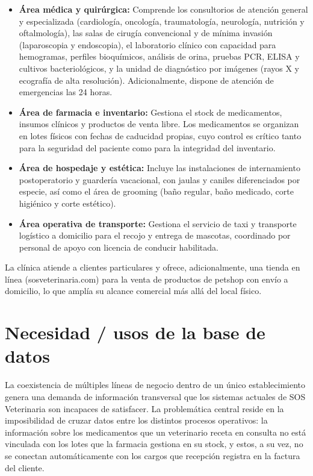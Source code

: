 \begin{itemize}
	\item \textbf{Área médica y quirúrgica:} Comprende los consultorios de atención general y especializada (cardiología, oncología, traumatología, neurología, nutrición y oftalmología), las salas de cirugía convencional y de mínima invasión (laparoscopia y endoscopia), el laboratorio clínico con capacidad para hemogramas, perfiles bioquímicos, análisis de orina, pruebas PCR, ELISA y cultivos bacteriológicos, y la unidad de diagnóstico por imágenes (rayos X y ecografía de alta resolución). Adicionalmente, dispone de atención de emergencias las 24 horas.
	\item \textbf{Área de farmacia e inventario:} Gestiona el stock de medicamentos, insumos clínicos y productos de venta libre. Los medicamentos se organizan en lotes físicos con fechas de caducidad propias, cuyo control es crítico tanto para la seguridad del paciente como para la integridad del inventario.
	\item \textbf{Área de hospedaje y estética:} Incluye las instalaciones de internamiento postoperatorio y guardería vacacional, con jaulas y caniles diferenciados por especie, así como el área de grooming (baño regular, baño medicado, corte higiénico y corte estético).
	\item \textbf{Área operativa de transporte:} Gestiona el servicio de taxi y transporte logístico a domicilio para el recojo y entrega de mascotas, coordinado por personal de apoyo con licencia de conducir habilitada.
\end{itemize}

La clínica atiende a clientes particulares y ofrece, adicionalmente, una tienda en línea (sosveterinaria.com) para la venta de productos de petshop con envío a domicilio, lo que amplía su alcance comercial más allá del local físico.

\section{Necesidad / usos de la base de datos}

La coexistencia de múltiples líneas de negocio dentro de un único establecimiento genera una demanda de información transversal que los sistemas actuales de SOS Veterinaria son incapaces de satisfacer. La problemática central reside en la imposibilidad de cruzar datos entre los distintos procesos operativos: la información sobre los medicamentos que un veterinario receta en consulta no está vinculada con los lotes que la farmacia gestiona en su stock, y estos, a su vez, no se conectan automáticamente con los cargos que recepción registra en la factura del cliente.

